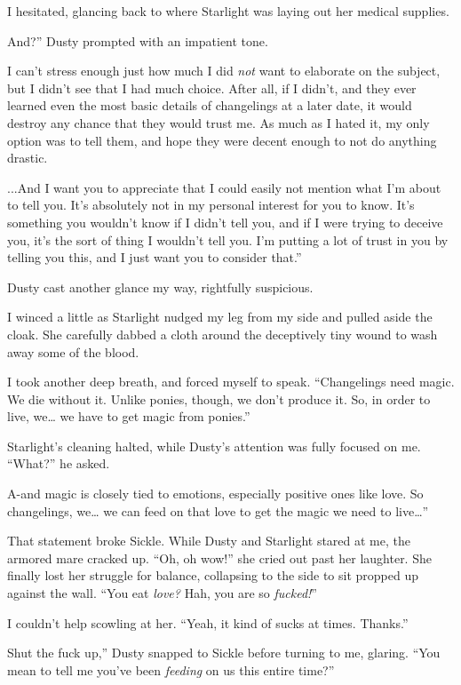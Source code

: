 I hesitated, glancing back to where Starlight was laying out her medical supplies.

\leavevmode{}And?” Dusty prompted with an impatient tone.

I can’t stress enough just how much I did \textit{not} want to elaborate on the subject, but I didn’t see that I had much choice. After all, if I didn’t, and they ever learned even the most basic details of changelings at a later date, it would destroy any chance that they would trust me. As much as I hated it, my only option was to tell them, and hope they were decent enough to not do anything drastic.

\leavevmode{}...And I want you to appreciate that I could easily not mention what I’m about to tell you. It’s absolutely not in my personal interest for you to know. It’s something you wouldn’t know if I didn’t tell you, and if I were trying to deceive you, it’s the sort of thing I wouldn’t tell you. I’m putting a lot of trust in you by telling you this, and I just want you to consider that.”

Dusty cast another glance my way, rightfully suspicious.

I winced a little as Starlight nudged my leg from my side and pulled aside the cloak. She carefully dabbed a cloth around the deceptively tiny wound to wash away some of the blood.

I took another deep breath, and forced myself to speak. “Changelings need magic. We die without it. Unlike ponies, though, we don’t produce it. So, in order to live, we… we have to get magic from ponies.”

Starlight’s cleaning halted, while Dusty’s attention was fully focused on me. “What?” he asked.

\leavevmode{}A-and magic is closely tied to emotions, especially positive ones like love. So changelings, we… we can feed on that love to get the magic we need to live…”

That statement broke Sickle. While Dusty and Starlight stared at me, the armored mare cracked up. “Oh, oh wow!” she cried out past her laughter. She finally lost her struggle for balance, collapsing to the side to sit propped up against the wall. “You eat \textit{love?} Hah, you are so \textit{fucked!}”

I couldn’t help scowling at her. “Yeah, it kind of sucks at times. Thanks.”

\leavevmode{}Shut the fuck up,” Dusty snapped to Sickle before turning to me, glaring. “You mean to tell me you’ve been \textit{feeding} on us this entire time?”

